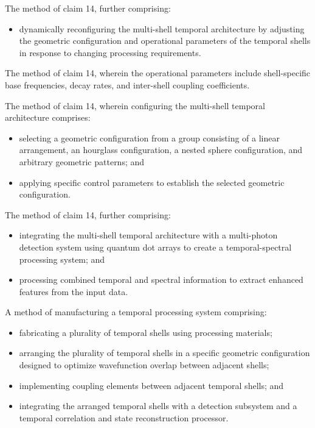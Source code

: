 \documentclass[12pt,letterpaper]{article}
\begin{document}
\begin{patentclaims}
    \item The method of claim 14, further comprising:
    \begin{itemize}[leftmargin=2em]
        \item dynamically reconfiguring the multi-shell temporal architecture by adjusting the geometric configuration and operational parameters of the temporal shells in response to changing processing requirements.
    \end{itemize}
    
    \item The method of claim 14, wherein the operational parameters include shell-specific base frequencies, decay rates, and inter-shell coupling coefficients.
    
    \item The method of claim 14, wherein configuring the multi-shell temporal architecture comprises:
    \begin{itemize}[leftmargin=2em]
        \item selecting a geometric configuration from a group consisting of a linear arrangement, an hourglass configuration, a nested sphere configuration, and arbitrary geometric patterns; and
        \item applying specific control parameters to establish the selected geometric configuration.
    \end{itemize}
    
    \item The method of claim 14, further comprising:
    \begin{itemize}[leftmargin=2em]
        \item integrating the multi-shell temporal architecture with a multi-photon detection system using quantum dot arrays to create a temporal-spectral processing system; and
        \item processing combined temporal and spectral information to extract enhanced features from the input data.
    \end{itemize}
    
    \item A method of manufacturing a temporal processing system comprising:
    \begin{itemize}[leftmargin=2em]
        \item fabricating a plurality of temporal shells using processing materials;
        \item arranging the plurality of temporal shells in a specific geometric configuration designed to optimize wavefunction overlap between adjacent shells;
        \item implementing coupling elements between adjacent temporal shells; and
        \item integrating the arranged temporal shells with a detection subsystem and a temporal correlation and state reconstruction processor.
    \end{itemize}
    

\end{patentclaims}
\end{document}
